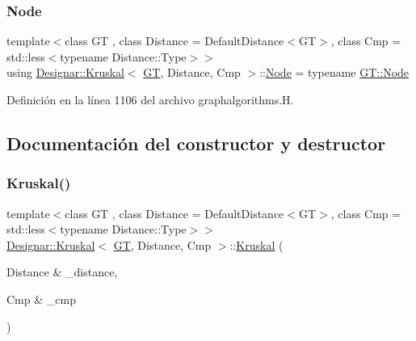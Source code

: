 \subsubsection{\texorpdfstring{Node}{Node}}
{\footnotesize\ttfamily template$<$class GT , class Distance  = Default\+Distance$<$\+G\+T$>$, class Cmp  = std\+::less$<$typename Distance\+::\+Type$>$$>$ \\
using \hyperlink{class_designar_1_1_kruskal}{Designar\+::\+Kruskal}$<$ \hyperlink{demo-buildgraph_8_c_a3001c40d2c31ca87ed96cd7d1334a55e}{GT}, Distance, Cmp $>$\+::\hyperlink{class_designar_1_1_kruskal_ae877bf49a387ddf132cfd824a0d258dd}{Node} =  typename \hyperlink{class_designar_1_1_graph_a5dfc7dba9d092ac489c72e40390c37d0}{G\+T\+::\+Node}}



Definición en la línea 1106 del archivo graphalgorithms.\+H.



\subsection{Documentación del constructor y destructor}
\mbox{\label{class_designar_1_1_kruskal_a930c064f2563fa43125656f6a3646882}} 
\subsubsection{\texorpdfstring{Kruskal()}{Kruskal()}\hspace{0.1cm}{\footnotesize\ttfamily [1/2]}}
{\footnotesize\ttfamily template$<$class GT , class Distance  = Default\+Distance$<$\+G\+T$>$, class Cmp  = std\+::less$<$typename Distance\+::\+Type$>$$>$ \\
\hyperlink{class_designar_1_1_kruskal}{Designar\+::\+Kruskal}$<$ \hyperlink{demo-buildgraph_8_c_a3001c40d2c31ca87ed96cd7d1334a55e}{GT}, Distance, Cmp $>$\+::\hyperlink{class_designar_1_1_kruskal}{Kruskal} (\begin{DoxyParamCaption}\item[{Distance \&}]{\+\_\+distance,  }\item[{Cmp \&}]{\+\_\+cmp }\end{DoxyParamCaption})\hspace{0.3cm}{\ttfamily [inline]}}



